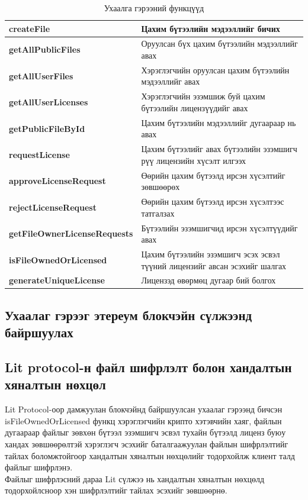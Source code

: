 \begin{table}[h!]
	\centering
   \begin{tabularx}{\textwidth}{|p{}|X|}
		\hline
		 \textbf{createFile}& Цахим бүтээлийн мэдээллийг бичих
	\\ \hline \textbf{getAllPublicFiles} & Оруулсан бүх цахим бүтээлийн мэдээллийг авах
	\\ \hline \textbf{getAllUserFiles} &  Хэрэглэгчийн оруулсан цахим бүтээлийн мэдээллийг авах
	\\ \hline \textbf{getAllUserLicenses} & Хэрэглэгчийн эзэмшиж буй цахим бүтээлийн лицензүүдийг авах
	\\ \hline \textbf{getPublicFileById} & Цахим бүтээлийн мэдээллийг дугаараар нь авах
	\\ \hline \textbf{requestLicense} & Цахим бүтээлийг авах бүтээлийн эзэмшигч рүү лицензийн хүсэлт илгээх
	\\ \hline \textbf{approveLicenseRequest} & Өөрийн цахим бүтээлд ирсэн хүсэлтийг зөвшөөрөх
	\\ \hline \textbf{rejectLicenseRequest} & Өөрийн цахим бүтээлд ирсэн хүсэлтээс татгалзах
	\\ \hline \textbf{getFileOwnerLicenseRequests} & Бүтээлийн эзэмшигчид ирсэн хүсэлтүүдийг авах
	\\ \hline \textbf{isFileOwnedOrLicensed} & Цахим бүтээлийн эзэмшигч эсэх эсвэл түүний лицензийг авсан эсэхийг шалгах
	\\ \hline \textbf{generateUniqueLicense} & Лицензэд өвөрмөц дугаар бий болгох                                                             \\ \hline
	\end{tabularx}
   \caption{Ухаалга гэрээний функцүүд}
\end{table}

\newpage
\subsection{Ухаалаг гэрээг этереум блокчэйн сүлжээнд байршуулах}


\subsection{Lit protocol-н файл шифрлэлт болон хандалтын хяналтын нөхцөл}
Lit Protocol-оор дамжуулан блокчэйнд байршуулсан ухаалаг гэрээнд бичсэн isFileOwnedOrLicensed функц хэрэглэгчийн крипто хэтэвчийн хаяг, файлын дугаараар файлыг зөвхөн бүтээл эзэмшигч эсвэл тухайн бүтээлд лиценз буюу хандах зөвшөөрөлтэй хэрэглэгч эсэхийг баталгаажуулан файлын шифрлэлтийг тайлах боломжтойгоор хандалтын хяналтын нөхцөлийг тодорхойлж клиент талд файлыг шифрлэнэ.
\\ Файлыг шифрлэсний дараа Lit сүлжээ нь хандалтын хяналтын нөхцөлд тодорхойлсноор хэн шифрлэлтийг тайлах эсэхийг зөвшөөрнө.
\\



